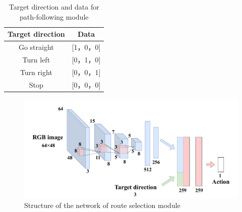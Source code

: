 \begin{table}[htbp]
    \centering
    \caption{Target direction and data for path-following module}\label{tab:target}
    \begin{tabular}{|c|c|}
    \hline
    Target direction & Data        \\
    \hline
    Go straight   & {[}1，0，0{]} \\
    Turn left   & {[}0，1，0{]} \\
    Turn right   & {[}0，0，1{]} \\
    Stop   & {[}0，0，0{]}\\
    \hline
    \end{tabular}
    \end{table}
\begin{figure}[htbp]
    \centering
     \includegraphics[width=130mm]{images/pdf/imi_net.pdf}
     \caption{Structure of the network of route selection module}
     \label{fig:imi_net}
\end{figure}

